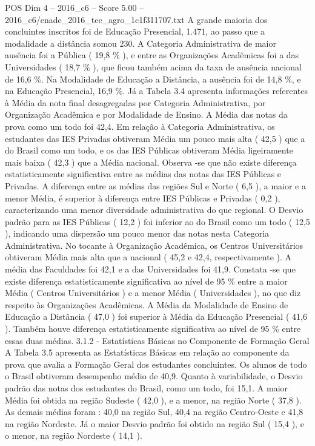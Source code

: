 \begin{textsample}{POS Dim 4 – 2016\_c6 – Score 5.00 – 2016\_c6/enade\_2016\_tec\_agro\_1c1f311707.txt}
A grande maioria dos concluintes inscritos foi de Educação Presencial, 1.471, ao passo que a modalidade a distância somou 230.
A Categoria Administrativa de maior ausência foi a Pública ( 19,8 \% ), e entre as Organizações Acadêmicas foi a das Universidades ( 18,7 \% ), que ficou também acima da taxa de ausência nacional de 16,6 \%.
Na Modalidade de Educação a Distância, a ausência foi de 14,8 \%, e na Educação Presencial, 16,9 \%.
Já a Tabela 3.4 apresenta informações referentes à Média da nota final desagregadas por Categoria Administrativa, por Organização Acadêmica e por Modalidade de Ensino.
A Média das notas da prova como um todo foi 42,4.
Em relação à Categoria Administrativa, os estudantes das IES Privadas obtiveram Média um pouco mais alta ( 42,5 ) que a do Brasil como um todo, e os das IES Públicas obtiveram Média ligeiramente mais baixa ( 42,3 ) que a Média nacional.
Observa -se que não existe diferença estatisticamente significativa entre as médias das notas das IES Públicas e Privadas.
A diferença entre as médias das regiões Sul e Norte ( 6,5 ), a maior e a menor Média, é superior à diferença entre IES Públicas e Privadas ( 0,2 ), caracterizando uma menor diversidade administrativa do que regional.
O Desvio padrão para as IES Públicas ( 12,2 ) foi inferior ao do Brasil como um todo ( 12,5 ), indicando uma dispersão um pouco menor das notas nesta Categoria Administrativa.
No tocante à Organização Acadêmica, os Centros Universitários obtiveram Média mais alta que a nacional ( 45,2 e 42,4, respectivamente ).
A média das Faculdades foi 42,1 e a das Universidades foi 41,9.
Constata -se que existe diferença estatisticamente significativa ao nível de 95 \% entre a maior Média ( Centros Universitários ) e a menor Média ( Universidades ), no que diz respeito às Organizações Acadêmicas.
A Média da Modalidade de Ensino de Educação a Distância ( 47,0 ) foi superior à Média da Educação Presencial ( 41,6 ).
Também houve diferença estatisticamente significativa ao nível de 95 \% entre essas duas médias. 3.1.2 - Estatísticas Básicas no Componente de Formação Geral A Tabela 3.5 apresenta as Estatísticas Básicas em relação ao componente da prova que avalia a Formação Geral dos estudantes concluintes.
Os alunos de todo o Brasil obtiveram desempenho médio de 40,9.
Quanto à variabilidade, o Desvio padrão das notas dos estudantes do Brasil, como um todo, foi 15,1.
A maior Média foi obtida na região Sudeste ( 42,0 ), e a menor, na região Norte ( 37,8 ).
As demais médias foram : 40,0 na região Sul, 40,4 na região Centro-Oeste e 41,8 na região Nordeste.
Já o maior Desvio padrão foi obtido na região Sul ( 15,4 ), e o menor, na região Nordeste ( 14,1 ).

\end{textsample}
